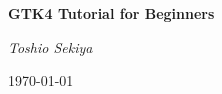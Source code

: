 \begin{titlepage}
    \centering
    \noindent\makebox[\textwidth]{\color{gnomeblue}\rule{\paperwidth}{20pt}}
    
    \vspace{4cm}
    
    {\Huge\bfseries\sffamily GTK4 Tutorial for Beginners \par}
    \vspace{3cm} 
    {\Large\itshape Toshio Sekiya \par}
    
    \vfill
    
    {\large \today \par}
    \vspace{1cm}
    \noindent\makebox[\textwidth]{\color{gnomeblue}\rule{\paperwidth}{5pt}}
\end{titlepage}

\cleardoublepage